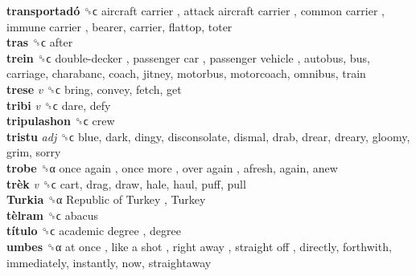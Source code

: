 \textbf{transportadó} ␝ϲ   aircraft carrier ,  attack aircraft carrier ,  common carrier ,  immune carrier , bearer, carrier, flattop, toter  \\
\textbf{tras} ␝ϲ  after  \\
\textbf{trein} ␝ϲ   double-decker ,  passenger car ,  passenger vehicle , autobus, bus, carriage, charabanc, coach, jitney, motorbus, motorcoach, omnibus, train  \\
\textbf{trese} \emph{v}  ␝ϲ  bring, convey, fetch, get  \\
\textbf{tribi} \emph{v}  ␝ϲ  dare, defy  \\
\textbf{tripulashon} ␝ϲ  crew  \\
\textbf{tristu} \emph{adj}  ␝ϲ  blue, dark, dingy, disconsolate, dismal, drab, drear, dreary, gloomy, grim, sorry  \\
\textbf{trobe} ␝α   once again ,  once more ,  over again , afresh, again, anew  \\
\textbf{trèk} \emph{v}  ␝ϲ  cart, drag, draw, hale, haul, puff, pull  \\
\textbf{Turkia} ␝α   Republic of Turkey ,  Turkey   \\
\textbf{tèlram} ␝ϲ  abacus  \\
\textbf{título} ␝ϲ   academic degree , degree  \\
\textbf{umbes} ␝α   at once ,  like a shot ,  right away ,  straight off , directly, forthwith, immediately, instantly, now, straightaway  \\
